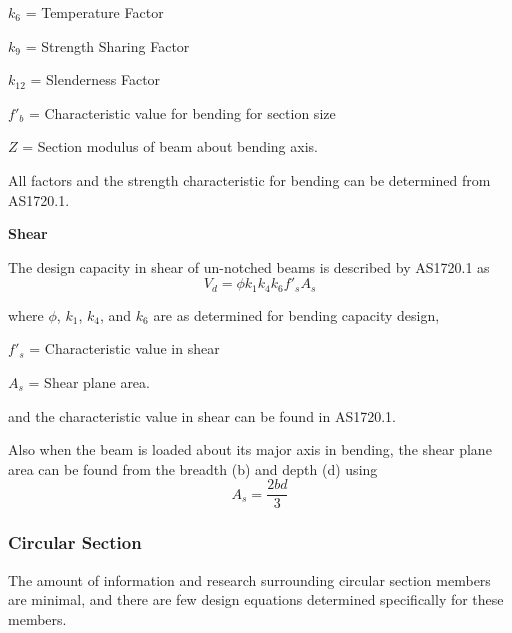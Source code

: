 \documentclass[11pt,a4paper]{article}
\numberwithin{equation}{subsection}
\begin{document}
	 $ k_{6} $ = Temperature Factor\par
	 
	 $ k_{9} $ = Strength Sharing Factor\par
	 
	 $ k_{12} $ = Slenderness Factor\par
	 
	 $ f'_{b} $ = Characteristic value for bending for section size
	 
	 $ Z $  = Section modulus of beam about bending axis.
	
	\vspace*{\baselineskip}
	
	\noindent
	All factors and the strength characteristic for bending can be determined from AS1720.1.
	
	\vspace*{\baselineskip}
	
	\noindent
	\textbf{Shear}\par
	
	\noindent
	The design capacity in shear of un-notched beams is described by AS1720.1 as
	\begin{equation}
	V_{d} = \phi k_{1} k_{4} k_{6} f'_{s} A_{s}
	\end{equation}
	
	\noindent
	where $\phi$, $k_{1}$, $k_{4}$, and $k_{6}$ are as determined for bending capacity design, \par
	
	$ f'_{s} $ = Characteristic value in shear\par
	
	$ A_{s} $ = Shear plane area.\par
	
	\vspace*{\baselineskip}
	
	\noindent
	and the characteristic value in shear can be found in AS1720.1. \par
	
	\vspace*{\baselineskip}
	
	\noindent
	Also when the beam is loaded about its major axis in bending, the shear plane area can be found from the breadth (b) and depth (d) using
	\begin{equation}
	A_{s} = \dfrac{2bd}{3}
	\end{equation}
	
	\subsubsection{Circular Section}
	The amount of information and research surrounding circular section members are minimal, and there are few design equations determined specifically for these members. 
	
\end{document}
